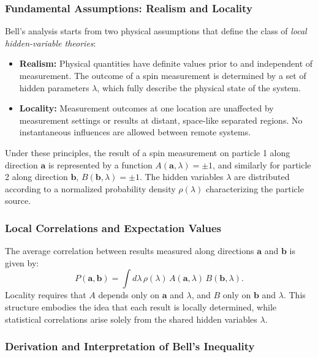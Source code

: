 \subsubsection{Fundamental Assumptions: Realism and Locality}

Bell’s analysis starts from two physical assumptions that define the class of \textit{local hidden-variable theories}:

\begin{itemize}
    \item \textbf{Realism:}  
    Physical quantities have definite values prior to and independent of measurement.  
    The outcome of a spin measurement is determined by a set of hidden parameters $\lambda$, which fully describe the physical state of the system.

    \item \textbf{Locality:}  
    Measurement outcomes at one location are unaffected by measurement settings or results at distant, space-like separated regions.  
    No instantaneous influences are allowed between remote systems.
\end{itemize}

Under these principles, the result of a spin measurement on particle 1 along direction $\mathbf{a}$ is represented by a function $A(\mathbf{a},\lambda) = \pm 1$, and similarly for particle 2 along direction $\mathbf{b}$, $B(\mathbf{b},\lambda) = \pm 1$.  
The hidden variables $\lambda$ are distributed according to a normalized probability density $\rho(\lambda)$ characterizing the particle source.

\subsubsection{Local Correlations and Expectation Values}

The average correlation between results measured along directions $\mathbf{a}$ and $\mathbf{b}$ is given by:
\begin{equation}
P(\mathbf{a},\mathbf{b}) = \int d\lambda\, \rho(\lambda)\, A(\mathbf{a},\lambda)\, B(\mathbf{b},\lambda).
\label{eq:bell-correlation}
\end{equation}
Locality requires that $A$ depends only on $\mathbf{a}$ and $\lambda$, and $B$ only on $\mathbf{b}$ and $\lambda$.  
This structure embodies the idea that each result is locally determined, while statistical correlations arise solely from the shared hidden variables $\lambda$.


\subsubsection{Derivation and Interpretation of Bell’s Inequality}

